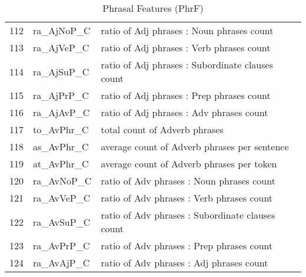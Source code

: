 \documentclass[11pt]{article}
\begin{document}
\begin{table}[H]
{\begin{tabular}{l@{\hspace{0.5ex}}|l@{\hspace{0.5ex}}|l@{\hspace{0.8ex}}}
        112    & ra\_AjNoP\_C   & ratio of Adj phrases : Noun phrases count                \\
        113    & ra\_AjVeP\_C   & ratio of Adj phrases : Verb phrases count                \\
        114    & ra\_AjSuP\_C   & ratio of Adj phrases : Subordinate clauses count         \\
        115    & ra\_AjPrP\_C   & ratio of Adj phrases : Prep phrases count                \\
        116    & ra\_AjAvP\_C   & ratio of Adj phrases : Adv phrases count                 \\
        117    & to\_AvPhr\_C   & total count of Adverb phrases                                   \\
        118    & as\_AvPhr\_C   & average count of Adverb phrases per sentence                    \\
        119    & at\_AvPhr\_C   & average count of Adverb phrases per token                       \\
        120    & ra\_AvNoP\_C   & ratio of Adv phrases : Noun phrases count                \\
        121    & ra\_AvVeP\_C   & ratio of Adv phrases : Verb phrases count                \\
        122    & ra\_AvSuP\_C   & ratio of Adv phrases : Subordinate clauses count         \\
        123    & ra\_AvPrP\_C   & ratio of Adv phrases : Prep phrases count                \\
        124    & ra\_AvAjP\_C   & ratio of Adv phrases : Adj phrases count                 \\    \hline          
    \end{tabular}
    }
\caption{\label{Append} Phrasal Features (PhrF)}
\end{table}
\end{document}
